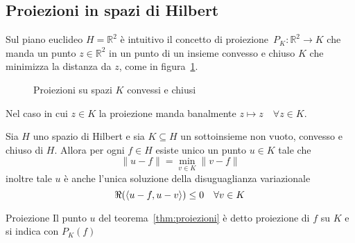 \subsection{Proiezioni in spazi di Hilbert}

Sul piano euclideo \(H = \mathbb{R}^2\) è intuitivo il concetto di
proiezione~\(P_K : \mathbb R^2 \rightarrow K\) che manda un punto \(z\in \mathbb
R^2\) in un punto di un insieme convesso e chiuso \(K\) che minimizza la
distanza da \(z\), come in figura~\ref{fig:teorema-delle-proiezioni}.
\begin{figure}[ht]
    \centering
    \caption{Proiezioni su spazi \(K\) convessi e chiusi}\label{fig:teorema-delle-proiezioni}
\end{figure}
Nel caso in cui \(z \in K\) la proiezione manda banalmente \(z \mapsto z \quad
\forall z \in K\). 

\begin{theorem}\label{thm:proiezioni}
    Sia \(H\) uno spazio di Hilbert e sia \(K \subseteq H \) un sottoinsieme non
    vuoto, convesso e chiuso di \(H\). Allora per ogni \(f \in H\) esiste unico
    un punto \(u \in K\) tale che 
    \begin{equation}\label{eq:PM}
      \|u - f\| = \min_{v \in K} \|v - f\|
    \end{equation}
    inoltre tale \(u\) è anche l'unica soluzione della disuguaglianza
    variazionale 
    \begin{equation}\label{eq:DV}
      \Re({\left\langle u-f, u-v\right\rangle}) \le 0 \quad \forall v \in K
    \end{equation}
\end{theorem}

\begin{definition}{Proiezione}
    Il punto \(u\) del teorema~\ref{thm:proiezioni} è detto proiezione di \(f\)
    su \(K\) e si indica con \(P_{K}{(f)}\)
\end{definition}

